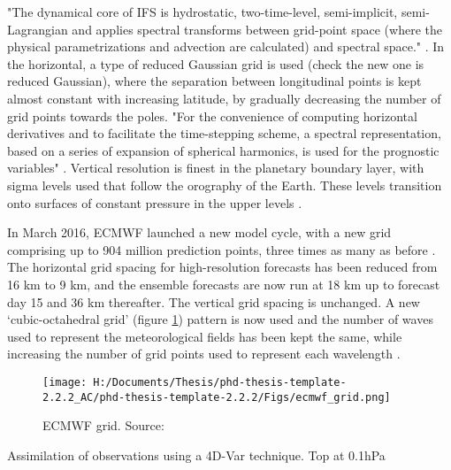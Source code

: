 "The dynamical core of IFS is hydrostatic, two-time-level, semi-implicit, semi-Lagrangian and applies spectral transforms between grid-point space (where the physical parametrizations and advection are calculated) and spectral space." \citep{ecmwf_atm_dyn}. In the horizontal, a type of reduced Gaussian grid is used (check the new one is reduced Gaussian), where the separation between longitudinal points is kept almost constant with increasing latitude, by gradually decreasing the number of grid points towards the poles. "For the convenience of computing horizontal derivatives and to facilitate the time-stepping scheme, a spectral representation, based on a series of expansion of spherical harmonics, is used for the prognostic variables" \citep{ecmwf_user_guide}. Vertical resolution is finest in the planetary boundary layer, with sigma levels used that follow the orography of the Earth. These levels transition onto surfaces of constant pressure in the upper levels \citep{ecmwf_user_guide}.

In March 2016, ECMWF  launched a new model cycle, with a new grid comprising up to 904 million prediction points, three times as many as before \citep{ecmwf_newmodel}.
The horizontal grid spacing for high-resolution forecasts has been reduced from 16 km to 9 km, and the ensemble forecasts are now run at 18 km up to forecast day 15 and 36 km thereafter. The vertical grid spacing is unchanged. A new ‘cubic-octahedral grid’ (figure \ref{fig:ecmwf_grid}) pattern is now used and the number of waves used to represent the meteorological fields has been kept the same, while increasing the number of grid points used to represent each wavelength \citep{ecmwf_newmodel}.

\begin{figure}
	
	\texttt{[image: H:/Documents/Thesis/phd-thesis-template-2.2.2\_AC/phd-thesis-template-2.2.2/Figs/ecmwf\_grid.png]}
	\caption{ECMWF grid. Source:\citep{ecmwf_infographic}}\label{fig:ecmwf_grid}
	\centering
\end{figure}


Assimilation of observations using a 4D-Var technique.
Top at 0.1hPa


